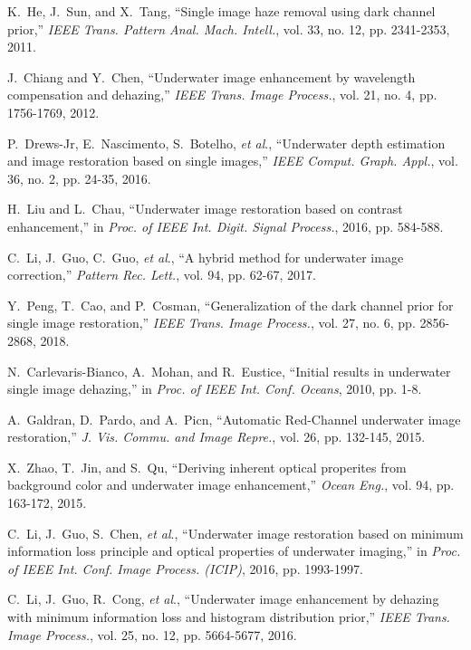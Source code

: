 \documentclass[journal]{IEEEtran}
\newcommand{\etal}{\textit{et al}.}
\begin{document}
\begin{thebibliography}{20}
K.~He, J.~Sun, and X.~Tang, ``Single image haze removal using dark channel prior,'' \emph{IEEE Trans. Pattern Anal. Mach. Intell.}, vol. 33, no. 12, pp. 2341-2353, 2011.

J.~Chiang and Y.~Chen, ``Underwater image enhancement by wavelength compensation and dehazing,'' \emph{IEEE Trans. Image Process.}, vol. 21, no. 4, pp. 1756-1769, 2012.

P.~Drews-Jr, E.~Nascimento, S.~Botelho, \etal, ``Underwater depth estimation and image restoration based on single images,'' \emph{IEEE Comput. Graph. Appl.}, vol. 36, no. 2, pp. 24-35, 2016.

H.~Liu and L.~Chau, ``Underwater image restoration based on contrast enhancement,'' in \emph{Proc. of IEEE Int. Digit. Signal Process.}, 2016, pp. 584-588.

C.~Li, J.~Guo, C.~Guo, \etal, ``A hybrid method for underwater image correction,'' \emph{Pattern Rec. Lett.}, vol. 94, pp. 62-67, 2017.

Y.~Peng, T.~Cao, and P.~Cosman, ``Generalization of the dark channel prior for single image restoration,'' \emph{IEEE Trans. Image Process.}, vol. 27, no. 6, pp. 2856-2868, 2018.

N.~Carlevaris-Bianco, A.~Mohan, and R.~Eustice, ``Initial results in underwater single image dehazing,'' in \emph{Proc. of IEEE Int. Conf. Oceans}, 2010, pp. 1-8.

A.~Galdran, D.~Pardo, and A.~Picn, ``Automatic Red-Channel underwater image restoration,'' \emph{J. Vis. Commu. and Image Repre.}, vol. 26, pp. 132-145, 2015.

X.~Zhao, T.~Jin, and S.~Qu, ``Deriving inherent optical properites from background color and underwater image enhancement,'' \emph{Ocean Eng.}, vol. 94, pp. 163-172, 2015.

C.~Li, J.~Guo, S.~Chen, \etal, ``Underwater image restoration based on minimum information loss principle and optical properties of underwater imaging,'' in \emph{Proc. of IEEE Int. Conf. Image Process. (ICIP)}, 2016, pp. 1993-1997.

C.~Li, J.~Guo, R.~Cong, \etal, ``Underwater image enhancement by dehazing with minimum information loss and histogram distribution prior,'' \emph{IEEE Trans. Image Process.}, vol. 25, no. 12, pp. 5664-5677, 2016.


\end{thebibliography}
\end{document}
